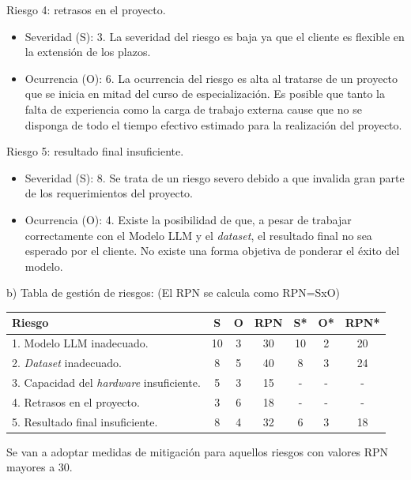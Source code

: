 \documentclass[
11pt, %
]{Clases/charter}
\begin{document}
Riesgo 4: retrasos en el proyecto.
\begin{itemize}
	\item Severidad (S): 3. La severidad del riesgo es baja ya que el cliente es flexible en la extensión de los plazos.
	\item Ocurrencia (O): 6. La ocurrencia del riesgo es alta al tratarse de un proyecto que se inicia en mitad del curso de especialización.
	      Es posible que tanto la falta de experiencia como la carga de trabajo externa cause que no se disponga de todo el tiempo efectivo estimado para la realización del proyecto.
\end{itemize}

Riesgo 5: resultado final insuficiente.
\begin{itemize}
	\item Severidad (S): 8. Se trata de un riesgo severo debido a que invalida gran parte de los requerimientos del proyecto.
	\item Ocurrencia (O): 4. Existe la posibilidad de que, a pesar de trabajar correctamente con el Modelo LLM y el \textit{dataset}, el resultado final no sea esperado por el cliente.
	      No existe una forma objetiva de ponderar el éxito del modelo.
\end{itemize}
b) Tabla de gestión de riesgos: (El RPN se calcula como RPN=SxO)

\begin{table}[htpb]
	\centering
	\begin{tabularx}{\linewidth}{@{}|X|c|c|c|c|c|c|@{}}
		\hline
		\rowcolor[HTML]{C0C0C0}
		Riesgo                                           & S  & O & RPN & S* & O* & RPN* \\ \hline
		1. Modelo LLM inadecuado.                        & 10 & 3 & 30  & 10 & 2  & 20   \\ \hline
		2. \textit{Dataset} inadecuado.                  & 8  & 5 & 40  & 8  & 3  & 24   \\ \hline
		3. Capacidad del \textit{hardware} insuficiente. & 5  & 3 & 15  & -  & -  & -    \\ \hline
		4. Retrasos en el proyecto.                      & 3  & 6 & 18  & -  & -  & -    \\ \hline
		5. Resultado final insuficiente.                 & 8  & 4 & 32  & 6  & 3  & 18   \\ \hline
	\end{tabularx}%
\end{table}

Se van a adoptar medidas de mitigación para aquellos riesgos con valores RPN mayores a 30.
\end{document}
